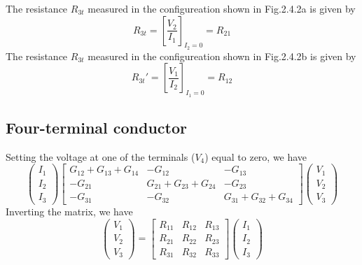\documentclass[11pt,a4paper]{book}
\theoremstyle{plain}
\theoremstyle{definition}
\theoremstyle{remark}
\begin{document}
The resistance $R_{3t}$ measured in the configureation shown in Fig.2.4.2a is given by
\begin{equation}
    R_{3t} = \left[\frac{V_2}{I_1}\right]_{I_2=0} = R_{21}
\end{equation}
The resistance $R_{3t}$ measured in the configureation shown in Fig.2.4.2b is given by
\begin{equation}
    R_{3t}' = \left[\frac{V_1}{I_2}\right]_{I_1=0} = R_{12}
\end{equation}
\subsection{Four-terminal conductor}
Setting the voltage at one of the terminals ($V_4$) equal to zero, we have
\begin{equation}
    \begin{pmatrix}
        I_1 \\ 
        I_2 \\
        I_3 
    \end{pmatrix}
    \begin{bmatrix}
        G_{12} + G_{13} + G_{14} & -G_{12} & -G_{13} \\
        -G_{21} & G_{21} + G_{23} + G_{24} & -G_{23} \\
        -G_{31} & -G_{32} & G_{31} + G_{32} + G_{34}
    \end{bmatrix}
    \begin{pmatrix}
        V_1 \\
        V_2 \\
        V_3
    \end{pmatrix}
\end{equation}
Inverting the matrix, we have
\begin{equation}
    \begin{pmatrix}
        V_1 \\
        V_2 \\
        V_3
    \end{pmatrix}
    =
    \begin{bmatrix}
        R_{11} & R_{12} & R_{13} \\
        R_{21} & R_{22} & R_{23} \\
        R_{31} & R_{32} & R_{33}
    \end{bmatrix}
    \begin{pmatrix}
        I_1 \\
        I_2 \\
        I_3
    \end{pmatrix}
\end{equation}
\end{document}
